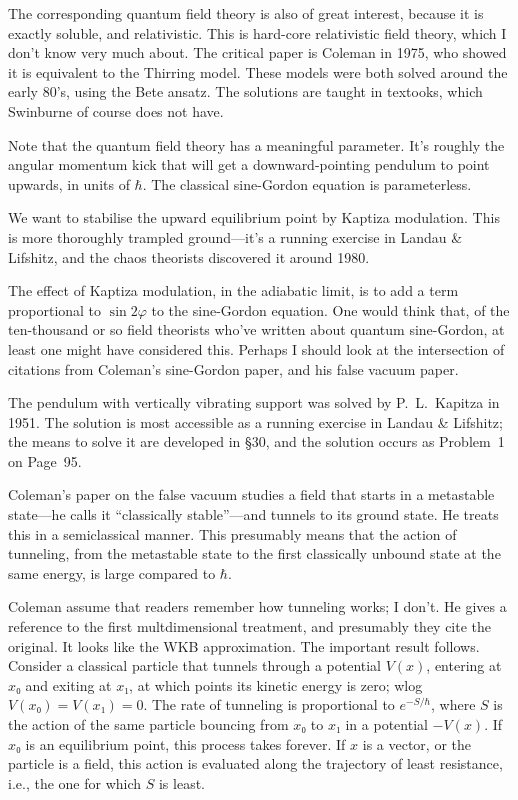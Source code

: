 The corresponding quantum field theory is also of great interest, because it is exactly soluble, and relativistic.  This is hard-core relativistic field theory, which I don't know very much about.  The critical paper is Coleman in 1975, who showed it is equivalent to the Thirring model.  These models were both solved around the early 80's, using the Bete ansatz.  The solutions are taught in textooks, which Swinburne of course does not have.

Note that the quantum field theory has a meaningful parameter.  It's roughly the angular momentum kick that will get a downward-pointing pendulum to point upwards, in units of $\hbar$.  The classical sine-Gordon equation is parameterless.

We want to stabilise the upward equilibrium point by Kaptiza modulation.  This is more thoroughly trampled ground—it's a running exercise in Landau \& Lifshitz, and the chaos theorists discovered it around 1980.

The effect of Kaptiza modulation, in the adiabatic limit, is to add a term proportional to $\sin 2φ$ to the sine-Gordon equation.  One would think that, of the ten-thousand or so field theorists who've written about quantum sine-Gordon, at least one might have considered this.  Perhaps I should look at the intersection of citations from Coleman's sine-Gordon paper, and his false vacuum paper.



The pendulum with vertically vibrating support was solved by P.~L.~Kapitza in 1951.  The solution is most accessible as a running exercise in Landau \& Lifshitz; the means to solve it are developed in \S 30, and the solution occurs as Problem~1 on Page~95.



Coleman's paper on the false vacuum studies a field that starts in a metastable state—he calls it “classically stable”—and tunnels to its ground state.  He treats this in a semiclassical manner.  This presumably means that the action of tunneling, from the metastable state to the first classically unbound state at the same energy, is large compared to $\hbar$.

Coleman assume that readers remember how tunneling works; I don't.  He gives a reference to the first multdimensional treatment, and presumably they cite the original.  It looks like the WKB approximation.  The important result follows.  Consider a classical particle that tunnels through a potential $V(x)$, entering at $x₀$ and exiting at $x₁$, at which points its kinetic energy is zero; wlog $V(x₀)=V(x₁)=0$.  The rate of tunneling is proportional to $e^{-S/\hbar}$, where $S$ is the action of the same particle bouncing from $x₀$ to $x₁$ in a potential $-V(x)$.  If $x₀$ is an equilibrium point, this process takes forever.  If $x$ is a vector, or the particle is a field, this action is evaluated along the trajectory of least resistance, i.e., the one for which $S$ is least.

